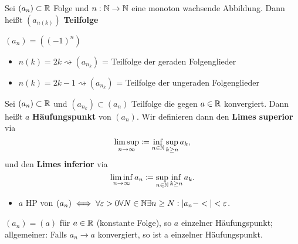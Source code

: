 \documentclass[consecutivenumbering]{gadsescript}
\begin{document}
\begin{subdefinition}
	Sei $ (a_n) \subset \mathbb{R} $ Folge und $ n : \mathbb{N} \to \mathbb{N} $ eine monoton wachsende Abbildung. Dann heißt $ (a_{n(k)}) $ \textbf{Teilfolge}
\end{subdefinition}

\begin{subexample}
	$(a_n) = ( (-1)^n ) $
	\begin{itemize}
		\item $ n(k) = 2k \rightsquigarrow (a_{n_k})$ = Teilfolge der geraden Folgenglieder
		\item $ n(k) = 2k - 1 \rightsquigarrow (a_{n_k})$ = Teilfolge der ungeraden Folgenglieder
	\end{itemize}
\end{subexample}

\begin{subdefinition}
	Sei $ (a_n) \subset \mathbb{R} $ und $ (a_{n_k}) \subset (a_n) $ Teilfolge die gegen $ a \in \mathbb{R} $ konvergiert. Dann heißt $ a $ \textbf{Häufungspunkt} von $ (a_n) $. Wir definieren dann den \textbf{Limes superior} via
	\[\limsup_{n\to\infty} \coloneqq \inf_{n\in\mathbb{N}} \sup_{k\geq n} a_k, \]
	und den \textbf{Limes inferior} via
	\[ \liminf_{n\to\infty} a_n \coloneqq \sup_{n\in\mathbb{N}} \inf_{k\geq n} a_k. \]
	\begin{itemize}
		\item $ a $ HP von $ (a_n)  \iff \forall \varepsilon > 0 \forall N \in \mathbb{N} \exists n \geq N : | a_n - < | < \varepsilon $.
	\end{itemize}
\end{subdefinition}

\begin{subexample}
	$ (a_n) = (a) $ für $ a \in \mathbb{R} $ (konstante Folge), so $ a $ einzelner Häufungspunkt; allgemeiner: Falls $ a_n \to a $ konvergiert,  so ist a einzelner Häufungspunkt.
\end{subexample}
\end{document}
